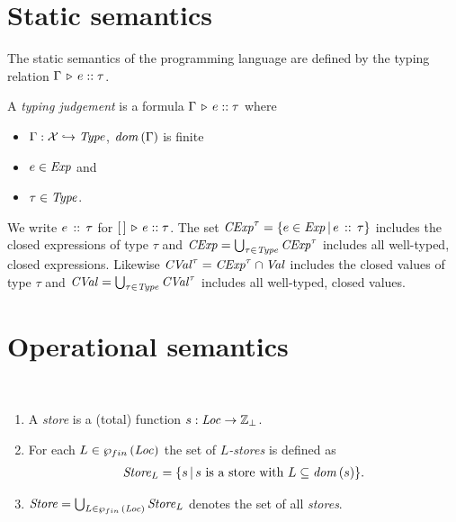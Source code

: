 \documentclass[12pt,a4paper]{report}
\newcommand{\CExp}{\nstyle{CExp}}
\newcommand{\CVal}{\nstyle{CVal}}
\begin{document}

\section{Static semantics}

The static semantics of the programming language are defined by the typing relation
$\Gamma\,\triangleright\,e\mathrel{::}\tau$.

\begin{definition}
  A {\em typing judgement} is a formula $\Gamma\,\triangleright\,e\mathrel{::}\tau$ where
  \begin{itemize}
    \item $\Gamma:\mathcal{X} \hookrightarrow \mathit{Type}$, $\mathit{dom}\,(\Gamma)$ is finite
    \item $e\in\mathit{Exp}$ and
    \item $\tau\in\mathit{Type}$.
  \end{itemize}
\end{definition}

We write $e\,\mathrel{::}\,\tau$ for $[\,]\,\triangleright\,e\mathrel{::}\tau$. The set $\CExp^\tau = \{e\in\Exp\,|\,\tj{e}{\tau}\}$
includes the closed expressions of type $\tau$ and $\CExp = \bigcup_{\tau\in\Type} \CExp^\tau$ includes
all well-typed, closed expressions. Likewise $\CVal^\tau = \CExp^\tau \cap \Val$ includes
the closed values of type $\tau$ and $\CVal = \bigcup_{\tau\in\Type} \CVal^\tau$ includes all well-typed,
closed values.



\section{Operational semantics}

\begin{definition}[Store] \label{definition:Store} \
  \begin{enumerate}
    \item A {\em store} is a (total) function $s:\mathit{Loc} \to \mathbb Z_\bot$.

    \item For each $L\in\wp_{fin}\,(\mathit{Loc})$ the set of {\em $L$-stores} is defined as
          \[\begin{array}{l}
            \mathit{Store}_L = \{s\,|\,\text{$s$ is a store with $L\subseteq\mathit{dom}\,(s)$}\}.
          \end{array}\]

    \item $\mathit{Store} = \bigcup_{L\in\wp_{fin}\,(\mathit{Loc})} \mathit{Store}_L$ denotes the set of all {\em stores}.
  \end{enumerate}
\end{definition}
\end{document}

